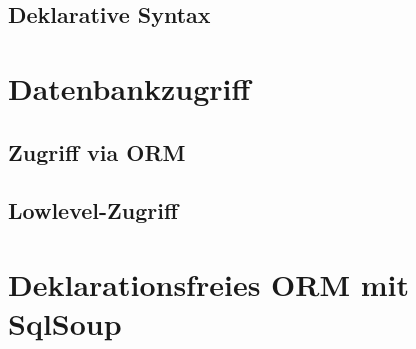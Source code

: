 

\subsection{Deklarative Syntax}

\section{Datenbankzugriff}
\subsection{Zugriff via ORM}
\subsection{Lowlevel-Zugriff}

\section{Deklarationsfreies ORM mit SqlSoup}

